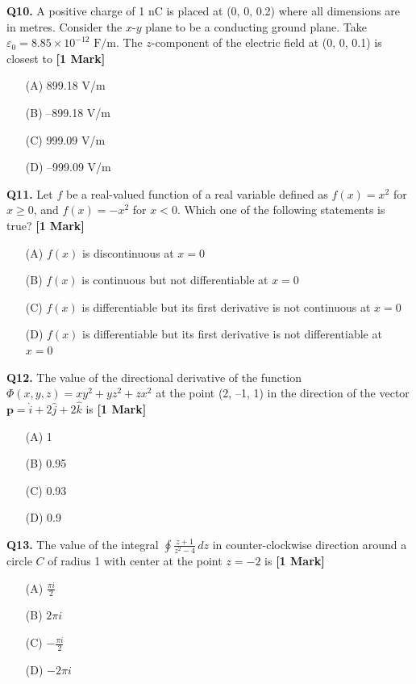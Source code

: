 \documentclass[11pt]{article}
\newcommand{\questiona}[2]{
    \noindent\textbf{Q#2.} #1 \hfill \textbf{[1 Mark]}
}
\begin{document}
\questiona{A positive charge of 1 nC is placed at (0, 0, 0.2) where all dimensions are in metres. Consider the \( x\text{-}y \) plane to be a conducting ground plane. Take \( \varepsilon_0 = 8.85 \times 10^{-12} \text{ F/m} \). The \( z \)-component of the electric field at (0, 0, 0.1) is closest to}{10}
\begin{enumerate}
    \item[(A)] 899.18 V/m
    \item[(B)] –899.18 V/m
    \item[(C)] 999.09 V/m
    \item[(D)] –999.09 V/m
\end{enumerate}
\vspace{0.5cm}

\questiona{Let \( f \) be a real-valued function of a real variable defined as \( f(x) = x^2 \) for \( x \geq 0 \), and \( f(x) = -x^2 \) for \( x < 0 \). Which one of the following statements is true?}{11}
\begin{enumerate}
    \item[(A)] \( f(x) \) is discontinuous at \( x = 0 \)
    \item[(B)] \( f(x) \) is continuous but not differentiable at \( x = 0 \)
    \item[(C)] \( f(x) \) is differentiable but its first derivative is not continuous at \( x = 0 \)
    \item[(D)] \( f(x) \) is differentiable but its first derivative is not differentiable at \( x = 0 \)
\end{enumerate}
\vspace{0.5cm}

\questiona{The value of the directional derivative of the function \( \Phi(x, y, z) = xy^2 + yz^2 + zx^2 \) at the point (2, –1, 1) in the direction of the vector \( \mathbf{p} = \hat{i} + 2\hat{j} + 2\hat{k} \) is}{12}
\begin{enumerate}
    \item[(A)] 1
    \item[(B)] 0.95
    \item[(C)] 0.93
    \item[(D)] 0.9
\end{enumerate}
\vspace{0.5cm}

\questiona{The value of the integral \( \oint \frac{z+1}{z^2 - 4} \, dz \) in counter-clockwise direction around a circle \( C \) of radius 1 with center at the point \( z = -2 \) is}{13}
\begin{enumerate}
    \item[(A)] \( \frac{\pi i}{2} \)
    \item[(B)] \( 2\pi i \)
    \item[(C)] \( -\frac{\pi i}{2} \)
    \item[(D)] \( -2\pi i \)
\end{enumerate}
\vspace{0.5cm}
\end{document}
